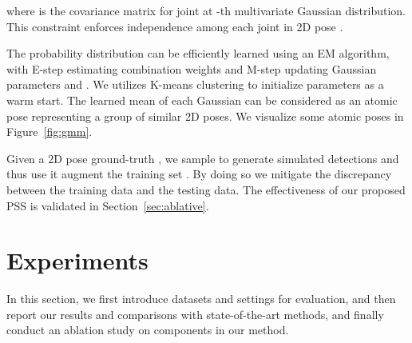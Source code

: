 \documentclass[letterpaper]{article} \usepackage{aaai18}  \usepackage{times}  \usepackage{helvet}  \usepackage{courier}  \usepackage{url}  \usepackage{color}
\begin{document}
where  is the covariance matrix for joint  at -th multivariate Gaussian distribution. This constraint enforces independence among each joint  in 2D pose .

The probability distribution  can be efficiently learned using an EM algorithm, with E-step estimating combination weights  and M-step updating Gaussian parameters  and . We utilizes K-means clustering to initialize parameters as a warm start. The learned mean  of each Gaussian can be considered as an atomic pose representing a group of similar 2D poses. We visualize some atomic poses in Figure~\ref{fig:gmm}.

Given a 2D pose ground-truth , we sample  to generate simulated detections  and thus use it augment the training set . By doing so we mitigate the discrepancy between the training data and the testing data. The effectiveness of our proposed PSS is validated in Section~\ref{sec:ablative}.


\section{Experiments} \label{sec:exp}

In this section, we first introduce datasets and settings for evaluation, and then report our results and comparisons with state-of-the-art methods, and finally conduct an ablation study on components in our method.
\end{document}
